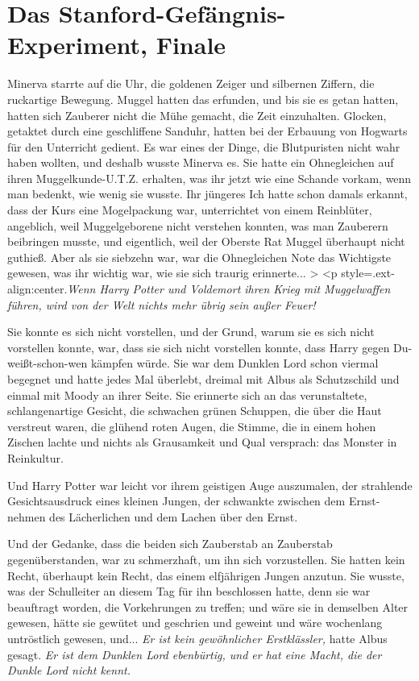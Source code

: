 \chapter{Das Stanford-Gefängnis-Experiment, Finale}

Minerva starrte auf die Uhr, die goldenen Zeiger und silbernen Ziffern, die
ruckartige Bewegung. Muggel hatten das erfunden, und bis sie es getan hatten,
hatten sich Zauberer nicht die Mühe gemacht, die Zeit einzuhalten. Glocken,
getaktet durch eine geschliffene Sanduhr, hatten bei der Erbauung von Hogwarts
für den Unterricht gedient. Es war eines der Dinge, die Blutpuristen nicht wahr
haben wollten, und deshalb wusste Minerva es. Sie hatte ein \glqq{}
Ohnegleichen\grqq{} auf ihren Muggelkunde-U.T.Z. erhalten, was ihr jetzt wie
eine Schande vorkam, wenn man bedenkt, wie wenig sie wusste. Ihr jüngeres Ich
hatte schon damals erkannt, dass der Kurs eine Mogelpackung war, unterrichtet
von einem Reinblüter, angeblich, weil Muggelgeborene nicht verstehen konnten,
was man Zauberern beibringen musste, und eigentlich, weil der Oberste Rat Muggel
überhaupt nicht guthieß. Aber als sie siebzehn war, war die Ohnegleichen Note
das Wichtigste gewesen, was ihr wichtig war, wie sie sich traurig erinnerte...
> <p
style=\grqq{}.ext-align:center\grqq{}.\emph{Wenn Harry Potter und Voldemort
ihren Krieg mit Muggelwaffen führen, wird von der Welt nichts mehr übrig sein
außer Feuer!}

Sie konnte es sich nicht vorstellen, und der Grund, warum sie es sich nicht
vorstellen konnte, war, dass sie sich nicht vorstellen konnte, dass Harry gegen
Du-weißt-schon-wen kämpfen würde. Sie war dem Dunklen Lord schon viermal
begegnet und hatte jedes Mal überlebt, dreimal mit Albus als Schutzschild und
einmal mit Moody an ihrer Seite. Sie erinnerte sich an das verunstaltete,
schlangenartige Gesicht, die schwachen grünen Schuppen, die über die Haut
verstreut waren, die glühend roten Augen, die Stimme, die in einem hohen Zischen
lachte und nichts als Grausamkeit und Qual versprach: das Monster in Reinkultur.

Und Harry Potter war leicht vor ihrem geistigen Auge auszumalen, der strahlende
Gesichtsausdruck eines kleinen Jungen, der schwankte zwischen dem Ernst-nehmen
des Lächerlichen und dem Lachen über den Ernst.

Und der Gedanke, dass die beiden sich Zauberstab an Zauberstab gegenüberstanden,
war zu schmerzhaft, um ihn sich vorzustellen. Sie hatten kein Recht, überhaupt
kein Recht, das einem elfjährigen Jungen anzutun. Sie wusste, was der
Schulleiter an diesem Tag für ihn beschlossen hatte, denn sie war beauftragt
worden, die Vorkehrungen zu treffen; und wäre sie in demselben Alter gewesen,
hätte sie gewütet und geschrien und geweint und wäre wochenlang untröstlich
gewesen, und... \emph{Er ist kein gewöhnlicher Erstklässler,} hatte Albus
gesagt. \emph{Er ist dem Dunklen Lord ebenbürtig, und er hat eine Macht, die der
Dunkle Lord nicht kennt.}

